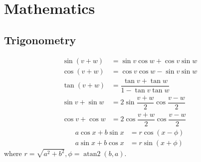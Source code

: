 
\chapter{Mathematics}





\section{Trigonometry}
\begin{align*}
\sin(v+w)&{}=\sin v\cos w+\cos v\sin w\\
\cos(v+w)&{}=\cos v\cos w-\sin v\sin w\\
\tan(v+w)&{}=\dfrac{\tan v+\tan w}{1-\tan v\tan w}\\
\sin v+\sin w&{}=2\sin\dfrac{v+w}{2}\cos\dfrac{v-w}{2}\\
\cos v+\cos w&{}=2\cos\dfrac{v+w}{2}\cos\dfrac{v-w}{2}
\end{align*}
\begin{align*}
	a\cos x+b\sin x&=r\cos(x-\phi)\\
	a\sin x+b\cos x&=r\sin(x+\phi)
\end{align*}
where $r=\sqrt{a^2+b^2}, \phi=\operatorname{atan2}(b,a)$.


